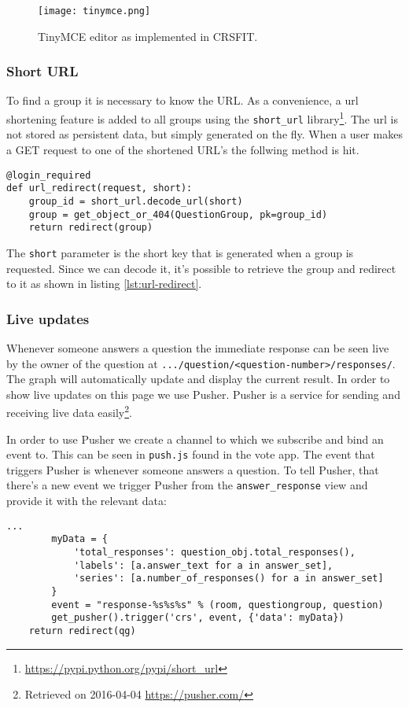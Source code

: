 \begin{figure}[H]
\capstart
	\centering
		\texttt{[image: tinymce.png]}
	\caption[TinyMCE]{TinyMCE editor as implemented in CRSFIT.}\label{fig:tinymce}
\end{figure}

\subsubsection*{Short URL}
To find a group it is necessary to know the URL. As a convenience, a url shortening feature is added to all groups using the \texttt{short\_url} library\footnote{\url{https://pypi.python.org/pypi/short_url}}. The url is not stored as persistent data, but simply generated on the fly. When a user makes a GET request to one of the shortened URL's the follwing method is hit.

\begin{lstlisting}[caption=The URL redirect method, label=lst:url-redirect]
@login_required
def url_redirect(request, short):
    group_id = short_url.decode_url(short)
    group = get_object_or_404(QuestionGroup, pk=group_id)
    return redirect(group)
\end{lstlisting}

The \texttt{short} parameter is the short key that is generated when a group is requested. Since we can decode it, it's possible to retrieve the group and redirect to it as shown in listing \ref{lst:url-redirect}.

\subsubsection*{Live updates}
Whenever someone answers a question the immediate response can be seen live by the owner of the question at \texttt{.../question/<question-number>/responses/}. The graph will automatically update and display the current result. In order to show live updates on this page we use Pusher. Pusher is a service for sending and receiving live data easily\footnote{Retrieved on 2016-04-04 \url{https://pusher.com/}}.


In order to use Pusher we create a channel to which we subscribe and bind an event to. This can be seen in \texttt{push.js} found in the vote app. The event that triggers Pusher is whenever someone answers a question. To tell Pusher, that there's a new event we trigger Pusher from the \texttt{answer\_response} view and provide it with the relevant data:

\begin{lstlisting}[caption=Selected parts of the answer\_response view, label=lst:answer_response]
        ...
        myData = {
            'total_responses': question_obj.total_responses(),
            'labels': [a.answer_text for a in answer_set],
            'series': [a.number_of_responses() for a in answer_set]
        }
        event = "response-%s%s%s" % (room, questiongroup, question)
        get_pusher().trigger('crs', event, {'data': myData})
    return redirect(qg)
\end{lstlisting}

